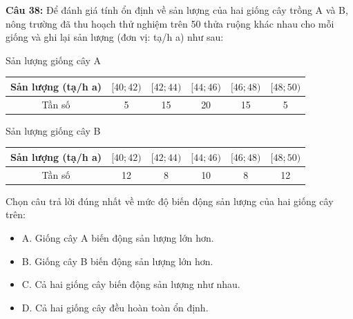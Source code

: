 \documentclass[12pt]{article}
\begin{document}
	\vspace{4mm}
	
	\noindent \textbf{Câu 38:} Để đánh giá tính ổn định về sản lượng của hai giống cây trồng A và B, nông trường đã thu hoạch thử nghiệm trên 50 thửa ruộng khác nhau cho mỗi giống và ghi lại sản lượng (đơn vị: tạ/h a) như sau:
	\begin{center}
		Sản lượng giống cây A
		\renewcommand{\arraystretch}{1.3}
		\begin{tabular}{|c|c|c|c|c|c|}
			\hline
			Sản lượng (tạ/h a) & $[40; 42)$ & $[42; 44)$ & $[44; 46)$ & $[46; 48)$ & $[48; 50)$ \\
			\hline
			Tần số & 5 & 15 & 20 & 15 & 5 \\
			\hline
		\end{tabular}
	\end{center}
	\begin{center}
		Sản lượng giống cây B
		\renewcommand{\arraystretch}{1.3}
		\begin{tabular}{|c|c|c|c|c|c|}
			\hline
			Sản lượng (tạ/h a) & $[40; 42)$ & $[42; 44)$ & $[44; 46)$ & $[46; 48)$ & $[48; 50)$ \\
			\hline
			Tần số & 12 & 8 & 10 & 8 & 12 \\
			\hline
		\end{tabular}
	\end{center}
	Chọn câu trả lời đúng nhất về mức độ biến động sản lượng của hai giống cây trên:
	\begin{itemize}[label=, leftmargin=*]
		\item A. Giống cây A biến động sản lượng lớn hơn.
		\item B. Giống cây B biến động sản lượng lớn hơn.
		\item C. Cả hai giống cây biến động sản lượng như nhau.
		\item D. Cả hai giống cây đều hoàn toàn ổn định.
	\end{itemize}
	
	\vspace{4mm}
	
\end{document}

